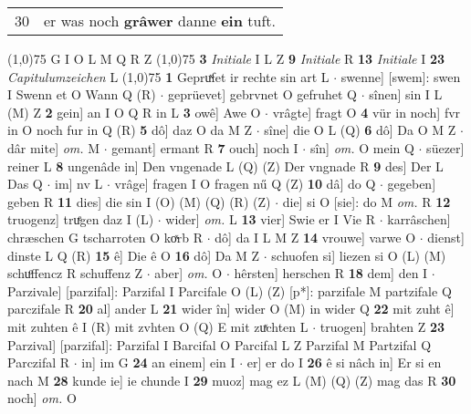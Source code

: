 \documentclass[8pt,a4paper,notitlepage]{article}
\begin{document}
\begin{table}[ht]
\begin{minipage}[t]{0.5\linewidth}
\begin{tabular}{rl}
30 & er was noch \textbf{grâwer} danne \textbf{ein} tuft.\\ 
\end{tabular}
\scriptsize
\line(1,0){75} \newline
G I O L M Q R Z \newline
\line(1,0){75} \newline
\textbf{3} \textit{Initiale} I L Z  \textbf{9} \textit{Initiale} R  \textbf{13} \textit{Initiale} I  \textbf{23} \textit{Capitulumzeichen} L  \newline
\line(1,0){75} \newline
\textbf{1} Gepruͯfet ir rechte sin art L  $\cdot$ swenne] [swem]: swen I Swenn et O Wann Q (R)  $\cdot$ geprüevet] gebrvnet O gefruhet Q  $\cdot$ sînen] sin I L (M) Z \textbf{2} gein] an I O Q R in L \textbf{3} owê] Awe O  $\cdot$ vrâgte] fragt O \textbf{4} vür in noch] fvr in O noch fur in Q (R) \textbf{5} dô] daz O da M Z  $\cdot$ sîne] die O L (Q) \textbf{6} dô] Da O M Z  $\cdot$ dâr mite] \textit{om.} M  $\cdot$ gemant] ermant R \textbf{7} ouch] noch I  $\cdot$ sîn] \textit{om.} O mein Q  $\cdot$ süezer] reiner L \textbf{8} ungenâde in] Den vngenade L (Q) (Z) Der vngnade R \textbf{9} des] Der L Das Q  $\cdot$ im] nv L  $\cdot$ vrâge] fragen I O fragen nű Q (Z) \textbf{10} dâ] do Q  $\cdot$ gegeben] geben R \textbf{11} dies] die sin I (O) (M) (Q) (R) (Z)  $\cdot$ die] si O [sie]: do M \textit{om.} R \textbf{12} truogenz] truͤgen daz I (L)  $\cdot$ wider] \textit{om.} L \textbf{13} vier] Swie er I Vie R  $\cdot$ karrâschen] chræschen G tscharroten O koͯrb R  $\cdot$ dô] da I L M Z \textbf{14} vrouwe] varwe O  $\cdot$ dienst] dinste L Q (R) \textbf{15} ê] Die ê O \textbf{16} dô] Da M Z  $\cdot$ schuofen si] liezen si O (L) (M) schuͦffencz R schuffenz Z  $\cdot$ aber] \textit{om.} O  $\cdot$ hêrsten] herschen R \textbf{18} dem] den I  $\cdot$ Parzivale] [parzifal]: Parzifal I Parcifale O (L) (Z) [p*]: parzifale  M partzifale Q parczifale R \textbf{20} al] ander L \textbf{21} wider în] wider O (M) in wider Q \textbf{22} mit zuht ê] mit zuhten ê I (R) mit zvhten O (Q) E mit zuͯchten L  $\cdot$ truogen] brahten Z \textbf{23} Parzival] [parzifal]: Parzifal I Barcifal O Parcifal L Z Parzifal M Partzifal Q Parczifal R  $\cdot$ in] im G \textbf{24} an einem] ein I  $\cdot$ er] er do I \textbf{26} ê si nâch in] Er si en nach M \textbf{28} kunde ie] ie chunde I \textbf{29} muoz] mag ez L (M) (Q) (Z) mag das R \textbf{30} noch] \textit{om.} O \newline
\end{minipage}
\hspace{0.5cm}

\end{table}
\end{document}
